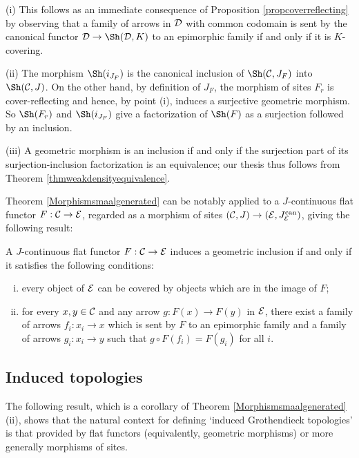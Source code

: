 \documentclass[a4paper,12pt]{article}
\begin{document}
\begin{proofs}
(i) This follows as an immediate consequence of Proposition \ref{propcoverreflecting} by observing that a family of arrows in $\cal D$ with common codomain is sent by the canonical functor ${\cal D}\to \Sh({\cal D}, K)$ to an epimorphic family if and only if it is $K$-covering. 	

(ii) The morphism $\Sh({i_{J_{F}}})$ is the canonical inclusion of $\Sh({\cal C}, J_{F})$ into $\Sh({\cal C}, J)$. On the other hand, by definition of $J_{F}$, the morphism of sites $F_{r}$ is cover-reflecting and hence, by point (i), induces a surjective geometric morphism. So $\Sh(F_{r})$ and $\Sh({i_{J_{F}}})$ give a factorization of $\Sh(F)$ as a surjection followed by an inclusion.

(iii) A geometric morphism is an inclusion if and only if the surjection part of its surjection-inclusion factorization is an equivalence; our thesis thus follows from Theorem \ref{thmweakdensityequivalence}.
\end{proofs}

Theorem \ref{Morphismsmaalgenerated} can be notably applied to a $J$-continuous flat  functor $F:{\cal C} \to {\cal E}$, regarded as a morphism of sites $({\cal C}, J)\to ({\cal E}, J_{\cal E}^{\textup{can}})$, giving the following result: 

\begin{corollary}\label{corinclusionflatfunctor}
	A $J$-continuous flat  functor $F:{\cal C} \to {\cal E}$ induces a geometric inclusion if and only if it satisfies the following conditions:  
	\begin{enumerate}[(i)]	
		\item every object of $\cal E$ can be covered by objects which are in the image of $F$;
		\item for every $x, y\in {\cal C}$ and any arrow $g:F(x)\to F(y)$ in $\cal E$, there exist a family of arrows $f_{i}:x_{i}\to x$ which is sent by $F$ to an epimorphic family and a family of arrows $g_{i}:x_{i}\to y$ such that $g\circ F(f_{i})=F(g_{i})$ for all $i$.
	\end{enumerate}  
\end{corollary}



\subsection{Induced topologies}\label{sec:inducedtopology}

The following result, which is a corollary of Theorem \ref{Morphismsmaalgenerated}(ii), shows that the natural context for defining `induced Grothendieck topologies' is that provided by flat functors (equivalently, geometric morphisms) or more generally morphisms of sites.
\end{document}
